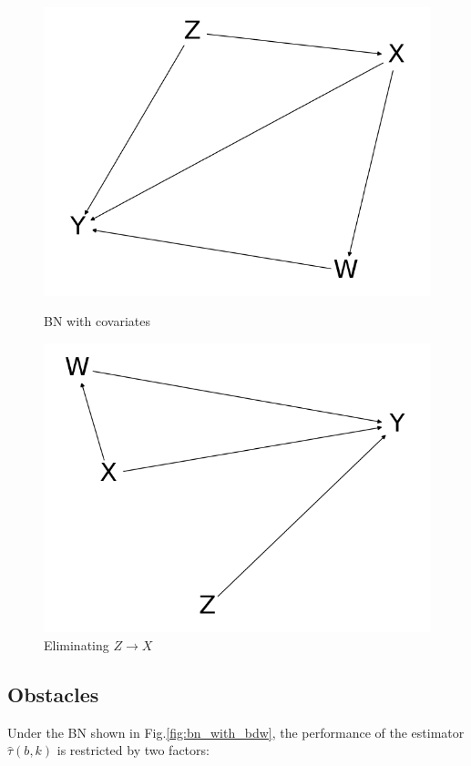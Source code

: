 \documentclass[a4 paper,12pt]{article}
\begin{document}
\begin{figure}[h]
	\centering
	\includegraphics[scale=0.3]{Figure_3.png}
   \caption{BN with covariates}
   \label{bn_with_covar}
	\includegraphics[scale=0.3]{Figure_4.png}
	\caption{Eliminating $Z\rightarrow X$}
	\label{bn_with_covar2}
\end{figure}

\subsection{Obstacles}
\label{sec:obstacles}

Under the BN shown in Fig.\ref{fig:bn_with_bdw}, the performance of the estimator $\hat \tau(b,k)$ is restricted by two factors:
\end{document}
